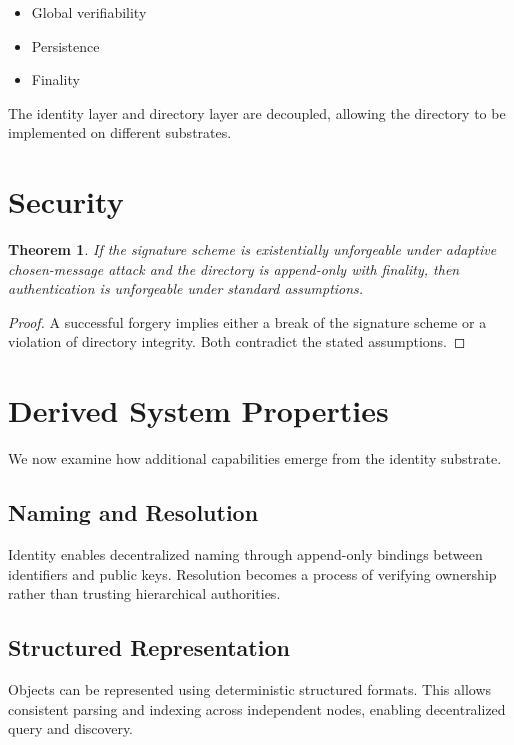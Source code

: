\documentclass[11pt,a4paper]{article}
\newtheorem{theorem}{Theorem}[section]
\begin{document}
\begin{itemize}
\item Global verifiability
\item Persistence
\item Finality
\end{itemize}

The identity layer and directory layer are decoupled, allowing the directory to be implemented on different substrates.

\section{Security}

\begin{theorem}
If the signature scheme is existentially unforgeable under adaptive chosen-message attack and the directory is append-only with finality, then authentication is unforgeable under standard assumptions.
\end{theorem}

\begin{proof}
A successful forgery implies either a break of the signature scheme or a violation of directory integrity. Both contradict the stated assumptions.
\end{proof}

\section{Derived System Properties}

We now examine how additional capabilities emerge from the identity substrate.

\subsection{Naming and Resolution}

Identity enables decentralized naming through append-only bindings between identifiers and public keys. Resolution becomes a process of verifying ownership rather than trusting hierarchical authorities.

\subsection{Structured Representation}

Objects can be represented using deterministic structured formats. This allows consistent parsing and indexing across independent nodes, enabling decentralized query and discovery.
\end{document}
